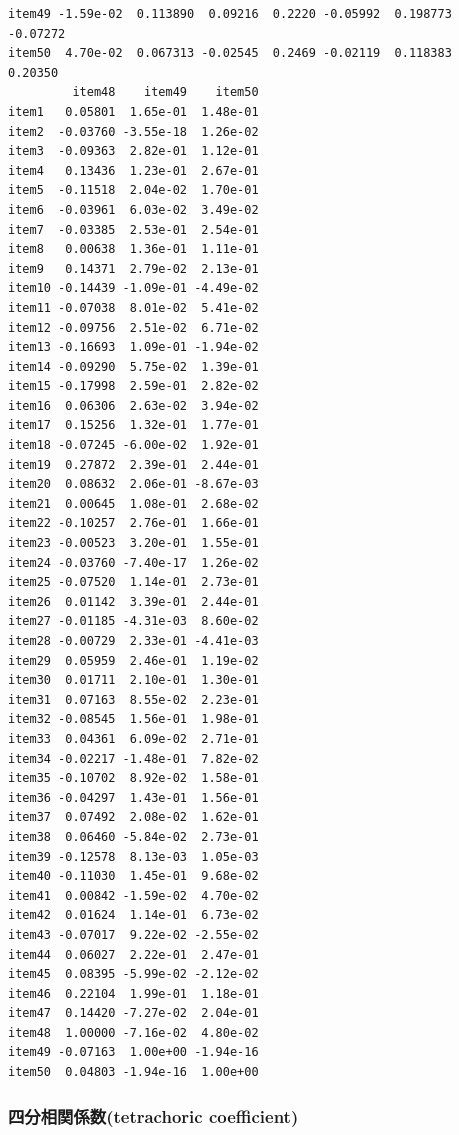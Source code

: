\documentclass[
  a4paper,
]{ltjsbook}
\newenvironment{Shaded}{\begin{snugshade}}{\end{snugshade}}
\newcommand{\NormalTok}[1]{\textcolor[rgb]{0.00,0.23,0.31}{#1}}
\newcommand{\SpecialCharTok}[1]{\textcolor[rgb]{0.37,0.37,0.37}{#1}}
\begin{document}
\begin{verbatim}
item49 -1.59e-02  0.113890  0.09216  0.2220 -0.05992  0.198773 -0.07272
item50  4.70e-02  0.067313 -0.02545  0.2469 -0.02119  0.118383  0.20350
         item48    item49    item50
item1   0.05801  1.65e-01  1.48e-01
item2  -0.03760 -3.55e-18  1.26e-02
item3  -0.09363  2.82e-01  1.12e-01
item4   0.13436  1.23e-01  2.67e-01
item5  -0.11518  2.04e-02  1.70e-01
item6  -0.03961  6.03e-02  3.49e-02
item7  -0.03385  2.53e-01  2.54e-01
item8   0.00638  1.36e-01  1.11e-01
item9   0.14371  2.79e-02  2.13e-01
item10 -0.14439 -1.09e-01 -4.49e-02
item11 -0.07038  8.01e-02  5.41e-02
item12 -0.09756  2.51e-02  6.71e-02
item13 -0.16693  1.09e-01 -1.94e-02
item14 -0.09290  5.75e-02  1.39e-01
item15 -0.17998  2.59e-01  2.82e-02
item16  0.06306  2.63e-02  3.94e-02
item17  0.15256  1.32e-01  1.77e-01
item18 -0.07245 -6.00e-02  1.92e-01
item19  0.27872  2.39e-01  2.44e-01
item20  0.08632  2.06e-01 -8.67e-03
item21  0.00645  1.08e-01  2.68e-02
item22 -0.10257  2.76e-01  1.66e-01
item23 -0.00523  3.20e-01  1.55e-01
item24 -0.03760 -7.40e-17  1.26e-02
item25 -0.07520  1.14e-01  2.73e-01
item26  0.01142  3.39e-01  2.44e-01
item27 -0.01185 -4.31e-03  8.60e-02
item28 -0.00729  2.33e-01 -4.41e-03
item29  0.05959  2.46e-01  1.19e-02
item30  0.01711  2.10e-01  1.30e-01
item31  0.07163  8.55e-02  2.23e-01
item32 -0.08545  1.56e-01  1.98e-01
item33  0.04361  6.09e-02  2.71e-01
item34 -0.02217 -1.48e-01  7.82e-02
item35 -0.10702  8.92e-02  1.58e-01
item36 -0.04297  1.43e-01  1.56e-01
item37  0.07492  2.08e-02  1.62e-01
item38  0.06460 -5.84e-02  2.73e-01
item39 -0.12578  8.13e-03  1.05e-03
item40 -0.11030  1.45e-01  9.68e-02
item41  0.00842 -1.59e-02  4.70e-02
item42  0.01624  1.14e-01  6.73e-02
item43 -0.07017  9.22e-02 -2.55e-02
item44  0.06027  2.22e-01  2.47e-01
item45  0.08395 -5.99e-02 -2.12e-02
item46  0.22104  1.99e-01  1.18e-01
item47  0.14420 -7.27e-02  2.04e-01
item48  1.00000 -7.16e-02  4.80e-02
item49 -0.07163  1.00e+00 -1.94e-16
item50  0.04803 -1.94e-16  1.00e+00
\end{verbatim}

\subsubsection{四分相関係数(tetrachoric
coefficient)}\label{ux56dbux5206ux76f8ux95a2ux4fc2ux6570tetrachoric-coefficient}

\begin{Shaded}
\end{Shaded}
\end{document}
